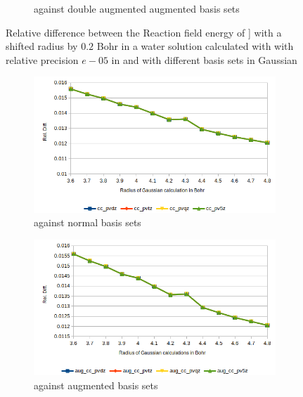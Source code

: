 \documentclass[../Thesis.tex]{subfiles}
\begin{document}
\begin{figure}[h!]
\begin{subfigure}[b]{0.75\linewidth}
    \caption{\mrchem against double augmented augmented basis sets}
  \end{subfigure}
  \caption[Relative difference between methods for  with radius $+0.2$ Bohr]{Relative difference between the Reaction field energy of ] with a shifted radius by $0.2$ Bohr in a water solution calculated with with relative precision $e-05$ in \mrchem
  and with different basis sets in Gaussian}
  \label{fig:watreldiff02}
\end{figure}

\begin{figure}[h!]
  \centering
  \begin{subfigure}[b]{0.75\linewidth}
    \includegraphics[width=\linewidth]{img/lipreldiff02.png}
    \caption{\mrchem against normal basis sets}
  \end{subfigure}
  \begin{subfigure}[b]{0.75\linewidth}
    \includegraphics[width=\linewidth]{img/lipaugreldiff02.png}
    \caption{\mrchem against augmented basis sets}
  \end{subfigure}
  \begin{subfigure}[b]{0.75\linewidth}

\end{subfigure}
\end{figure}
\end{document}
